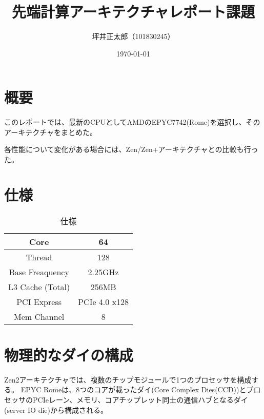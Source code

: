\documentclass[a4paper,10pt]{jsarticle}
\begin{document}
\title{先端計算アーキテクチャレポート課題}
\author{坪井正太郎（101830245）}
\date{\today}
\maketitle
\section{概要}
このレポートでは、最新のCPUとしてAMDのEPYC7742(Rome)を選択し、そのアーキテクチャをまとめた。

各性能について変化がある場合には、Zen/Zen+アーキテクチャとの比較も行った。

\section{仕様}
\begin{table}[H]
  \centering
  \label{仕様}
  \caption{仕様}
  \begin{tabular}{|c|c|}
    \hline
    Core             & 64            \\ \hline
    Thread           & 128           \\ \hline
    Base Freaquency  & 2.25GHz       \\ \hline
    L3 Cache (Total) & 256MB         \\ \hline
    PCI Express      & PCIe 4.0 x128 \\ \hline
    Mem Channel      & 8             \\ \hline
  \end{tabular}
\end{table}

\section{物理的なダイの構成}
Zen2アーキテクチャでは、複数のチップモジュールで1つのプロセッサを構成する。
EPYC Romeは、8つのコアが載ったダイ(Core Complex Dies(CCD))とプロセッサのPCIeレーン、メモリ、コアチップレット同士の通信ハブとなるダイ(server IO die)から構成される。
\end{document}
